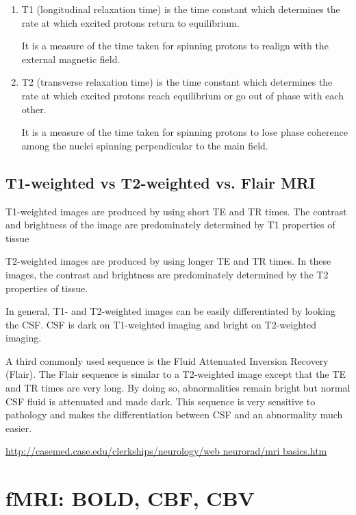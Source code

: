 \begin{enumerate}
  
  
  \item T1 (longitudinal relaxation time) is the time constant which
determines the rate at which excited protons return to equilibrium. 

It is a measure of the time taken for spinning protons to realign with the
external magnetic field.


  \item T2 (transverse relaxation time) is the time constant which
determines the rate at which excited protons reach equilibrium or go out of
phase with each other.

 It is a measure of the time taken for spinning protons to lose phase coherence among the nuclei spinning perpendicular to the main field.
 
\end{enumerate}

\subsection{T1-weighted vs T2-weighted vs. Flair MRI}
\label{sec:T1-weight-MRI}
\label{sec:T2-weight-MRI}

T1-weighted images are produced by using short TE and TR times.
The contrast and brightness of the image are predominately determined by T1 properties of tissue

T2-weighted images are produced by using longer TE and TR times. In these
images, the contrast and brightness are predominately determined by the T2
properties of tissue.

In general, T1- and T2-weighted images can be easily differentiated by looking
the CSF. CSF is dark on T1-weighted imaging and bright on T2-weighted imaging.

A third commonly used sequence is the Fluid Attenuated Inversion Recovery
(Flair). The Flair sequence is similar to a T2-weighted image except that the TE
and TR times are very long. By doing so, abnormalities remain bright but normal
CSF fluid is attenuated and made dark. This sequence is very sensitive to
pathology and makes the differentiation between CSF and an abnormality much
easier.


\url{http://casemed.case.edu/clerkships/neurology/web neurorad/mri basics.htm}


\section{fMRI: BOLD, CBF, CBV}
\label{sec:fMRI}


